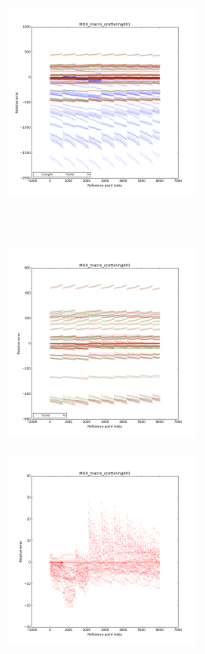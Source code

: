 \begin{center}
\begin{figure}[!h]
\begin{subfigure}[b]{0.45\textwidth}
		\end{subfigure}
\end{figure}
\begin{figure}[!h]\ContinuedFloat
		\centering
		\begin{subfigure}[b]{0.45\textwidth}
				\includegraphics[width=\linewidth,height=5cm]{images/MOX/MOX_macro_scattering001_with_cocagne.png}
		\end{subfigure}
		~
		\begin{subfigure}[b]{0.45\textwidth}
				\includegraphics[width=\linewidth,height=5cm]{images/MOX/MOX_macro_scattering001.png}
		\end{subfigure}
		\begin{subfigure}[b]{0.45\textwidth}
				\includegraphics[width=\linewidth,height=5cm]{images/MOX/MOX_macro_scattering001_alone.png}
		\end{subfigure}

\end{figure}
\end{center}

